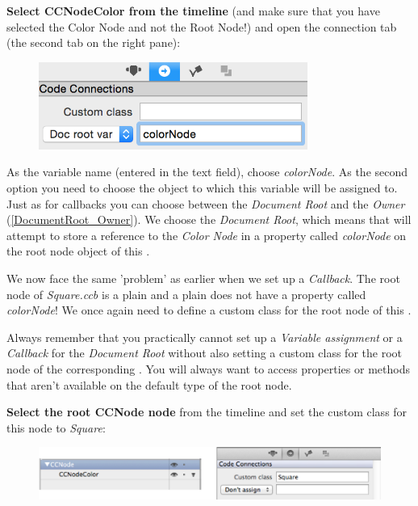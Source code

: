 \begin{leftbar}
\textbf{Select CCNodeColor from the timeline} (and make sure that you
have selected the Color Node and not the Root Node!) and open the connection tab
(the second tab on the right pane):
\begin{figure}[H]
		\centering
		\includegraphics[width=250pt]{images/Chapter1/square_code_connection.png}
\end{figure}
As the variable name (entered in the text field), choose \textit{colorNode}.
As the second option you need to choose the object to which this variable will be
assigned to. Just as for callbacks you can choose between the \textit{Document
Root} and the \textit{Owner} (\ref{DocumentRoot_Owner}). We choose the
\textit{Document Root}, which means that \SB{} will attempt to store a reference
to the \textit{Color Node} in a property called \textit{colorNode}
 on the root node object of this \ccbfile{}.
\end{leftbar}

We now face the same 'problem' as earlier when we set up a
\textit{Callback}. The root node of \textit{Square.ccb} is a plain \ccnode{} and
a plain \ccnode{} does not have a property called
\textit{colorNode}! We once again need to define a custom class for the root
node of this \ccbfile{}.

\begin{details} 
Always remember that you practically cannot set up a \textit{Variable
assignment} or a \textit{Callback} for the \textit{Document Root} without also
setting a custom class for the root node of the corresponding \ccbfile{}. You
will always want to access properties or methods that aren't available on the
default type of the root node.
\end{details}

\begin{leftbar}
\textbf{Select the root CCNode node} from the timeline and set the custom class
for this node to \textit{Square}:
\begin{figure}[H]
		\centering
		\includegraphics[width=350pt]{images/firstproject/square_custom_class.png}
\end{figure}
\end{leftbar}

